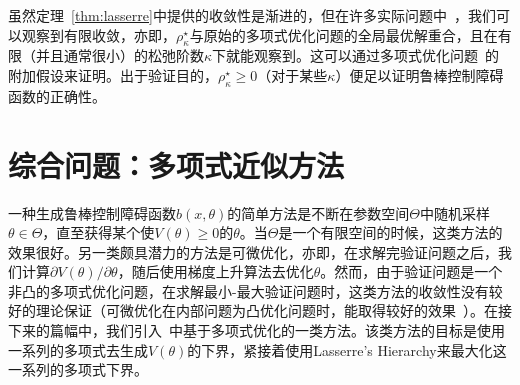 虽然定理~\ref{thm:lasserre}中提供的收敛性是渐进的，但在许多实际问题中~\cite{yang22mp-inexact}，我们可以观察到有限收敛，亦即，$\rho_\kappa^\star$与原始的多项式优化问题的全局最优解重合，且在有限（并且通常很小）的松弛阶数$\kappa$下就能观察到。这可以通过多项式优化问题~\cite{nie14mp-optimality}的附加假设来证明。出于验证目的，$\rho^\star_\kappa \geq 0$（对于某些$\kappa$）便足以证明鲁棒控制障碍函数的正确性。

\section{综合问题：多项式近似方法}
\label{sec:sdpsynthesis}

一种生成鲁棒控制障碍函数$b(x,\theta)$的简单方法是不断在参数空间$\Theta$中随机采样$\theta \in \Theta$，直至获得某个使$V(\theta) \ge 0$的$\theta$。当$\Theta$是一个有限空间的时候，这类方法的效果很好。另一类颇具潜力的方法是可微优化，亦即，在求解完验证问题之后，我们计算$\partial V(\theta) / \partial \theta$，随后使用梯度上升算法去优化$\theta$。然而，由于验证问题是一个非凸的多项式优化问题，在求解最小-最大验证问题时，这类方法的收敛性没有较好的理论保证（可微优化在内部问题为凸优化问题时，能取得较好的效果~\cite{bennett22mp-hierarchical}）。在接下来的篇幅中，我们引入~\cite{lasserre11jgo-minmaxpop}中基于多项式优化的一类方法。该类方法的目标是使用一系列的多项式去生成$V(\theta)$的下界，紧接着使用Lasserre's Hierarchy来最大化这一系列的多项式下界。

